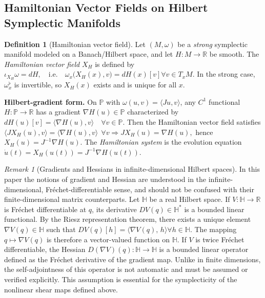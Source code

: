 \documentclass{article}
\theoremstyle{plain}
\theoremstyle{definition}
\newtheorem{definition}[theorem]{Definition}
\theoremstyle{remark}
\newtheorem{remark}[theorem]{Remark}
\newcommand{\bbH}{\mathbb{H}}
\newcommand{\bbP}{\mathbb{P}}
\begin{document}
\subsection{Hamiltonian Vector Fields on Hilbert Symplectic Manifolds}
\label{subsec:inf-dim-ham-vectorfield}
\begin{definition}[Hamiltonian vector field]
Let $(M,\omega)$ be a \emph{strong} symplectic manifold modeled on a Banach/Hilbert space, and let
$H:M\to\mathbb{R}$ be smooth.
The \emph{Hamiltonian vector field} $X_H$ is defined by
\(\iota_{X_H}\omega = dH,\quad
\text{i.e.}\quad
\omega_x\big(X_H(x), v\big) = dH(x)[v]
\forall v\in T_xM.
\)
In the strong case, $\omega^\flat_x$ is invertible, so $X_H(x)$ exists and is unique for all $x$.
\end{definition}
\textbf{Hilbert-gradient form.}
On $\bbP$ with $\omega(u,v)=\langle Ju,v\rangle$, any $C^1$ functional $H:\bbP\to\mathbb{R}$ has a
gradient $\nabla H(u)\in\bbP$ characterized by
\(
dH(u)[v] = \langle \nabla H(u), v\rangle \quad \forall v\in\bbP.
\)
Then the Hamiltonian vector field satisfies
\(
\langle JX_H(u), v\rangle = \langle \nabla H(u), v\rangle \ \ \forall v
\Longrightarrow
JX_H(u)=\nabla H(u),
\)
hence
\(
X_H(u)=J^{-1}\nabla H(u).
\)
The \emph{Hamiltonian system} is the evolution equation
\(
\dot u(t) = X_H(u(t)) = J^{-1}\nabla H(u(t)).
\)

\begin{remark}[Gradients and Hessians in infinite-dimensional Hilbert spaces]
\label{rem:frechet-gradient-hessian}
In this paper the notions of gradient and Hessian are understood
in the infinite-dimensional, Fr\'echet-differentiable sense, and should not be confused with
their finite-dimensional matrix counterparts.
Let $\bbH$ be a real Hilbert space.
If $V:\bbH\to\mathbb{R}$ is Fr\'echet differentiable at $q$, its derivative
$DV(q)\in\bbH^*$ is a bounded linear functional.
By the Riesz representation theorem, there exists a unique element
$\nabla V(q)\in\bbH$ such that
\(
DV(q)[h] = \langle \nabla V(q),\, h\rangle  \forall h\in\bbH.
\)
The mapping $q\mapsto\nabla V(q)$ is therefore a vector-valued function on $\bbH$.
If $V$ is twice Fr\'echet differentiable, the Hessian
$D(\nabla V)(q):\bbH\to\bbH$ is a bounded linear operator defined as the Fr\'echet derivative
of the gradient map.
Unlike in finite dimensions, the self-adjointness of this operator is not automatic and must
be assumed or verified explicitly.
This assumption is essential for the symplecticity of the nonlinear shear maps defined above.
\end{remark}
\end{document}
